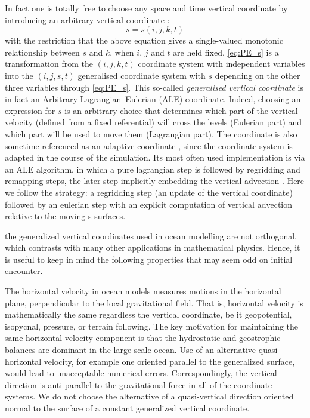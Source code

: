 \documentclass[../main/NEMO_manual]{subfiles}
\begin{document}
In fact one is totally free to choose any space and time vertical coordinate by
introducing an arbitrary vertical coordinate :
\begin{equation}
  \label{eq:PE_s}
  s=s(i,j,k,t)
\end{equation}
with the restriction that the above equation gives a single-valued monotonic relationship between $s$ and $k$,
when $i$, $j$ and $t$ are held fixed.
\autoref{eq:PE_s} is a transformation from the $(i,j,k,t)$ coordinate system with independent variables into
the $(i,j,s,t)$ generalised coordinate system with $s$ depending on the other three variables through
\autoref{eq:PE_s}.
This so-called \textit{generalised vertical coordinate} \citep{Kasahara_MWR74} is in fact
an Arbitrary Lagrangian--Eulerian (ALE) coordinate.
Indeed, choosing an expression for $s$ is an arbitrary choice that determines
which part of the vertical velocity (defined from a fixed referential) will cross the levels (Eulerian part) and
which part will be used to move them (Lagrangian part).
The coordinate is also sometime referenced as an adaptive coordinate \citep{Hofmeister_al_OM09},
since the coordinate system is adapted in the course of the simulation.
Its most often used implementation is via an ALE algorithm,
in which a pure lagrangian step is followed by regridding and remapping steps,
the later step implicitly embedding the vertical advection
\citep{Hirt_al_JCP74, Chassignet_al_JPO03, White_al_JCP09}.
Here we follow the \citep{Kasahara_MWR74} strategy:
a regridding step (an update of the vertical coordinate) followed by an eulerian step with
an explicit computation of vertical advection relative to the moving s-surfaces.



the generalized vertical coordinates used in ocean modelling are not orthogonal,
which contrasts with many other applications in mathematical physics.
Hence, it is useful to keep in mind the following properties that may seem odd on initial encounter.

The horizontal velocity in ocean models measures motions in the horizontal plane,
perpendicular to the local gravitational field.
That is, horizontal velocity is mathematically the same regardless the vertical coordinate, be it geopotential,
isopycnal, pressure, or terrain following.
The key motivation for maintaining the same horizontal velocity component is that
the hydrostatic and geostrophic balances are dominant in the large-scale ocean.
Use of an alternative quasi-horizontal velocity, for example one oriented parallel to the generalized surface,
would lead to unacceptable numerical errors.
Correspondingly, the vertical direction is anti-parallel to the gravitational force in
all of the coordinate systems.
We do not choose the alternative of a quasi-vertical direction oriented normal to
the surface of a constant generalized vertical coordinate. 
\end{document}
